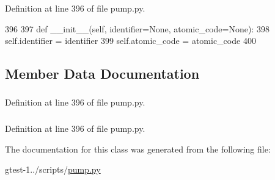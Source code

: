 \-Definition at line 396 of file pump.\-py.


\begin{DoxyCode}
396 
397   def __init__(self, identifier=None, atomic_code=None):
398     self.identifier = identifier
399     self.atomic_code = atomic_code
400 

\end{DoxyCode}


\subsection{\-Member \-Data \-Documentation}
\hypertarget{classpump_1_1VarNode_a37b98239728299970150b73c1a05c287}{
\subsubsection[{atomic\-\_\-code}]{}}\label{d9/dae/classpump_1_1VarNode_a37b98239728299970150b73c1a05c287}


\-Definition at line 396 of file pump.\-py.

\hypertarget{classpump_1_1VarNode_afc486b0767ef05e2dc12f5b98be72902}{
\subsubsection[{identifier}]{}}\label{d9/dae/classpump_1_1VarNode_afc486b0767ef05e2dc12f5b98be72902}


\-Definition at line 396 of file pump.\-py.



\-The documentation for this class was generated from the following file\-:\begin{DoxyCompactItemize}
\item 
gtest-\/1../scripts/\hyperlink{pump_8py}{pump.\-py}\end{DoxyCompactItemize}
